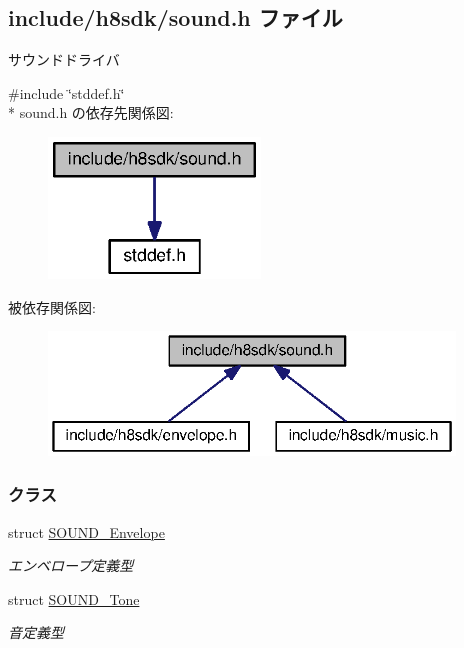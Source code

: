 \subsection{include/h8sdk/sound.h ファイル}
\label{sound_8h}


サウンドドライバ  


{\ttfamily \#include \char`\"{}stddef.\+h\char`\"{}}\\*
sound.\+h の依存先関係図\+:
\nopagebreak
\begin{figure}[H]
\begin{center}
\leavevmode
\includegraphics[width=160pt]{dd/d14/sound_8h__incl}
\end{center}
\end{figure}
被依存関係図\+:
\nopagebreak
\begin{figure}[H]
\begin{center}
\leavevmode
\includegraphics[width=306pt]{d9/df5/sound_8h__dep__incl}
\end{center}
\end{figure}
\subsubsection*{クラス}
\begin{DoxyCompactItemize}
\item 
struct \hyperlink{sound_8h_d0/d92/structSOUND__Envelope}{S\+O\+U\+N\+D\+\_\+\+Envelope}
\begin{DoxyCompactList}\small\item\em エンベロープ定義型 \end{DoxyCompactList}\item 
struct \hyperlink{sound_8h_d6/d3c/structSOUND__Tone}{S\+O\+U\+N\+D\+\_\+\+Tone}
\begin{DoxyCompactList}\small\item\em 音定義型 \end{DoxyCompactList}\end{DoxyCompactItemize}
